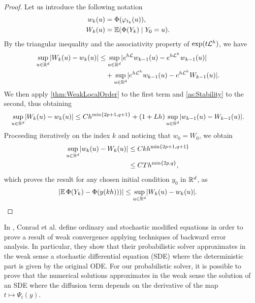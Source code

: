 \documentclass[10pt]{article}
\begin{document}
\begin{proof} Let us introduce the following notation
	\begin{equation}
		\begin{aligned}
			w_k(u) &= \Phi(\varphi_{t_k}(u)),\\
			W_k(u) &= \operatorname{\mathbb{E}}(\Phi(Y_k) \mid Y_0 = u).
		\end{aligned}
	\end{equation}
	By the triangular inequality and the associativity property of $\exp(t\mathcal{L}^h)$, we have
	\begin{equation}
		\begin{aligned}
			\sup_{u\in\mathbb{R}^d}\lvert W_k(u) - w_k(u)\rvert &\leq \sup_{u\in\mathbb{R}^d}\lvert e^{h\mathcal{L}}w_{k-1}(u) - e^{h\mathcal{L}^h}w_{k-1}(u)\rvert \\
			&\quad + \sup_{u\in\mathbb{R}^d}\lvert e^{h\mathcal{L}^h}w_{k-1}(u) - e^{h\mathcal{L}^h}W_{k-1}(u)\rvert.
		\end{aligned}
	\end{equation}
	We then apply \cref{thm:WeakLocalOrder} to the first term and \cref{as:Stability} to the second, thus obtaining
	\begin{equation}
		\sup_{u\in\mathbb{R}^d}\lvert W_k(u) - w_k(u)\rvert \leq Ch^{\min\{2p+1, q + 1\}} + (1 + Lh)\sup_{u\in\mathbb{R}^d}\lvert w_{k-1}(u) - W_{k-1}(u)\rvert.
	\end{equation}
	Proceeding iteratively on the index $k$ and noticing that $w_0 = W_0$, we obtain
	\begin{equation}
		\begin{aligned}
			\sup_{u\in\mathbb{R}^d}\lvert w_k(u) - W_k(u)\rvert &\leq C k h^{\min\{2p+1, q + 1\}}\\
			&\leq C T h^{\min\{2p, q\}},	
		\end{aligned}
	\end{equation}
	which proves the result for any chosen initial condition $y_0$ in $\mathbb{R}^d$, as
	\begin{equation}
		\lvert\operatorname{\mathbb{E}}\Phi(Y_k) - \Phi(y(kh)))\rvert \leq \sup_{u\in\mathbb{R}^d}\lvert W_k(u) - w_k(u)\rvert.
	\end{equation}
\end{proof}

\begin{remark} In \cite{CGS16}, Conrad et al. define ordinary and stochastic modified equations in order to prove a result of weak convergence applying techniques of backward error analysis. In particular, they show that their probabilistic solver approximates in the weak sense a stochastic differential equation (SDE) where the deterministic part is given by the original ODE. For our probabilistic solver, it is possible to prove that the numerical solutions approximates in the weak sense the solution of an SDE where the diffusion term depends on the derivative of the map $t \mapsto \Psi_t(y)$.
\end{remark}
\end{document}

